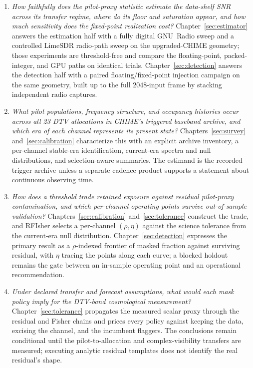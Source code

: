 \begin{enumerate}
\item[\textbf{RQ1.}] \emph{How faithfully does the pilot-proxy statistic estimate
the data-shelf SNR across its transfer regime, where do its floor and saturation
appear, and how much sensitivity does the fixed-point realization cost?}
Chapter~\ref{sec:estimator} answers the estimation half with a fully digital
GNU~Radio sweep and a controlled LimeSDR radio-path sweep on the upgraded-CHIME
geometry; those experiments are threshold-free and compare the floating-point,
packed-integer, and GPU paths on identical trials.  Chapter~\ref{sec:detection}
answers the detection half with a paired floating/fixed-point injection
campaign on the same geometry, built up to the full $2048$-input frame by
stacking independent radio captures.

\item[\textbf{RQ2.}] \emph{What pilot populations, frequency structure, and
occupancy histories occur across all 23 DTV allocations in CHIME's triggered
baseband archive, and which era of each channel represents its present
state?}  Chapters~\ref{sec:survey} and~\ref{sec:calibration} characterize this
with an explicit archive inventory, a per-channel stable-era identification,
current-era spectra and null distributions, and selection-aware summaries.  The
estimand is the recorded trigger archive unless a separate cadence product
supports a statement about continuous observing time.

\item[\textbf{RQ3.}] \emph{How does a threshold trade retained exposure against
residual pilot-proxy contamination, and which per-channel operating points
survive out-of-sample validation?}  Chapters~\ref{sec:calibration}
and~\ref{sec:tolerance} construct the trade, and RFIsher selects a per-channel
$(\rho,\eta)$ against the science tolerance from the current-era null
distribution.  Chapter~\ref{sec:detection} expresses the primary result as a
$\rho$-indexed frontier of masked fraction against surviving residual, with
$\eta$ tracing the points along each curve; a blocked holdout remains the gate
between an in-sample operating point and an operational recommendation.

\item[\textbf{RQ4.}] \emph{Under declared transfer and forecast assumptions,
what would each mask policy imply for the DTV-band cosmological measurement?}
Chapter~\ref{sec:tolerance} propagates the measured scalar proxy through the
residual and Fisher chains and prices every policy against keeping the data,
excising the channel, and the incumbent flaggers.  The conclusions remain
conditional until the pilot-to-allocation and complex-visibility transfers are
measured; executing analytic residual templates does not identify the real
residual's shape.


\end{enumerate}
